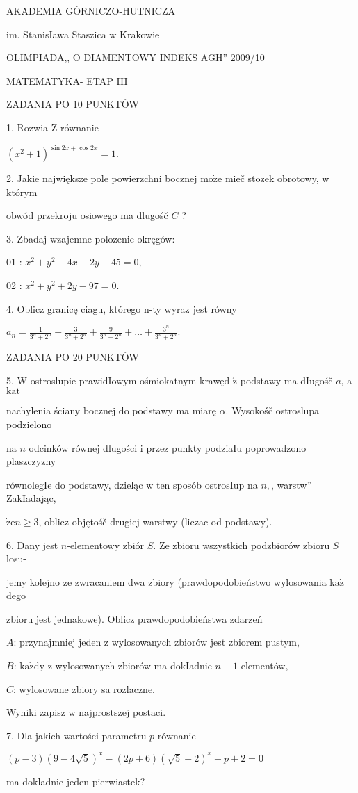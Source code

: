 \documentclass[a4paper,12pt]{article}
\begin{document}
AKADEMIA GÓRNICZO-HUTNICZA

im. StanisIawa Staszica w Krakowie

OLIMPIADA,, O DIAMENTOWY INDEKS AGH'' 2009/10

MATEMATYKA- ETAP III

ZADANIA PO 10 PUNKTÓW

1. Rozwia $\dot{\mathrm{Z}}$ równanie

$(x^{2}+1)^{\sin 2x+\cos 2x}=1.$

2. Jakie największe pole powierzchni bocznej $\mathrm{m}\mathrm{o}\dot{\mathrm{z}}\mathrm{e}$ mieč stozek obrotowy, w którym

obwód przekroju osiowego ma dlugośč $C$ ?

3. Zbadaj wzajemne polozenie okręgów:

01 : $x^{2}+y^{2}-4x-2y-45=0,$

02 : $x^{2}+y^{2}+2y-97=0.$

4. Oblicz granicę ciagu, którego n-ty wyraz jest równy

$a_{n}=\displaystyle \frac{1}{3^{n}+2^{n}}+\frac{3}{3^{n}+2^{n}}+\frac{9}{3^{n}+2^{n}}+\ldots+\frac{3^{n}}{3^{n}+2^{n}}.$

ZADANIA PO 20 PUNKTÓW

5. $\mathrm{W}$ ostroslupie prawidIowym ośmiokatnym krawęd $\acute{\mathrm{z}}$ podstawy ma dIugośč $a$, a $\mathrm{k}\mathrm{a}\mathrm{t}$

nachylenia ściany bocznej do podstawy ma miarę $\alpha$. Wysokośč ostroslupa podzielono

na $n$ odcinków równej dlugości i przez punkty podziaIu poprowadzono plaszczyzny

równolegIe do podstawy, dzieląc w ten sposób ostrosIup na $n,$, warstw'' ZakIadając,

$\dot{\mathrm{z}}\mathrm{e}n\geq 3$, oblicz objętośč drugiej warstwy (liczac od podstawy).

6. Dany jest $n$-elementowy zbiór $S$. Ze zbioru wszystkich podzbiorów zbioru $S$ losu-

jemy kolejno ze zwracaniem dwa zbiory (prawdopodobieństwo wylosowania $\mathrm{k}\mathrm{a}\dot{\mathrm{z}}$ dego

zbioru jest jednakowe). Oblicz prawdopodobieństwa zdarzeń

$A$: przynajmniej jeden z wylosowanych zbiorów jest zbiorem pustym,

$B$: $\mathrm{k}\mathrm{a}\dot{\mathrm{z}}\mathrm{d}\mathrm{y}$ z wylosowanych zbiorów ma dokIadnie $n-1$ elementów,

$C$: wylosowane zbiory sa rozlaczne.

Wyniki zapisz w najprostszej postaci.

7. Dla jakich wartości parametru $p$ równanie

$(p-3)(9-4\sqrt{5})^{x}-(2p+6)(\sqrt{5}-2)^{x}+p+2=0$

ma dokladnie jeden pierwiastek?
\end{document}
